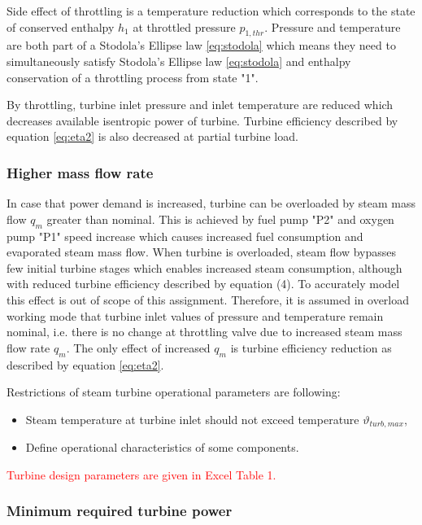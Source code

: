 \documentclass{article}
\begin{document}
	Side effect of throttling is a temperature reduction which corresponds to the state of conserved enthalpy $h_1$ at throttled pressure $p_{1,thr}$. Pressure and temperature are both part of a Stodola’s Ellipse law \ref{eq:stodola} which means they need to simultaneously satisfy Stodola’s Ellipse law  \ref{eq:stodola}  and enthalpy conservation of a throttling process from state "1".
	
	By throttling, turbine inlet pressure and inlet temperature are reduced which decreases available isentropic power of turbine. Turbine efficiency described by equation \ref{eq:eta2} is also decreased at partial turbine load.
	
	\subsubsection*{Higher mass flow rate}
	
	In case that power demand is increased, turbine can be overloaded by steam mass flow $q_m$ greater than nominal. This is achieved by fuel pump "P2" and oxygen pump "P1" speed increase which causes increased fuel consumption and evaporated steam mass flow. When turbine is overloaded, steam flow bypasses few initial turbine stages which enables increased steam consumption, although with reduced turbine efficiency described by equation (4). To accurately model this effect is out of scope of this assignment. Therefore, it is assumed in overload working mode that turbine inlet values of pressure and temperature remain nominal, i.e. there is no change at throttling valve due to increased steam mass flow rate $q_m$. The only effect of increased $q_m$ is turbine efficiency reduction as described by equation \ref{eq:eta2}.
	
	Restrictions of steam turbine operational parameters are following:
	
	\begin{itemize}
		\item Steam temperature at turbine inlet should not exceed temperature $\vartheta_{turb,max}$,
		\item Define operational characteristics of some components.
	\end{itemize}
	
	\noindent
	\textcolor{red}{Turbine design parameters are given in Excel Table 1.}

	\subsubsection*{Minimum required turbine power}
\end{document}
